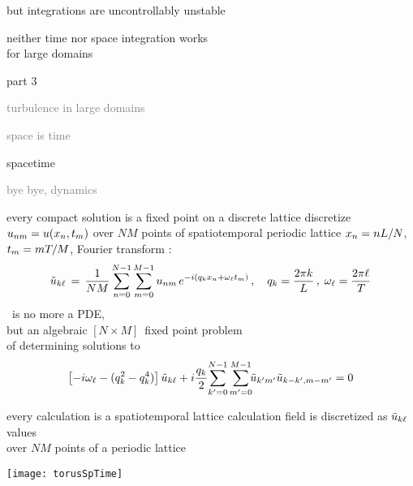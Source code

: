 \begin{frame}{but integrations are uncontrollably unstable}
\begin{center}
{\huge neither} time {\huge nor} space integration {\huge works} \\
for large domains
\end{center}

\vfill
\color{red}{rethink the calculation}
\end{frame}

\begin{frame}{part 3}
\begin{enumerate}
              \item
    \textcolor{gray}{\small
turbulence in large domains
              \item
space is time
    }
              \item {\Large
spacetime
    }\textcolor{gray}{\small
              \item
bye bye, dynamics
                    }
            \end{enumerate}
\end{frame}


\begin{frame}{every compact solution is a fixed point on a discrete lattice}
discretize $u_{nm} = u(x_n,t_m)$ over
$N M$ points of spatiotemporal periodic lattice $x_n = n L/N$,
 $t_m = m {T_{}}/M$, Fourier transform :
%
\[
\tilde{u}_{k\ell} \,=\,
  \frac{1}{NM} \sum^{N-1}_{n=0} \sum^{M-1}_{m=0}
  u_{nm} \, e^{-i(q_kx_n + \omega_\ell t_m)}
    \,,\quad
q_k = \frac{2 \pi k}{L}
    \,,\;
\omega_\ell = \frac{2 \pi \ell}{{T_{}}}
\]
\KS\ is no more a PDE, \\
but an algebraic $[N\!\times\!M]$\dmn\ fixed point problem \\
of determining solutions to
\[
\left[- i \omega_\ell - ( q_k^2 - q_k^4 ) \right]\tilde{u}_{k\ell}
+ i \frac{q_k}{2} \!\sum_{k'=0}^{N-1} \sum^{M-1}_{m'=0}\!\!
\tilde{u}_{k'm'} \tilde{u}_{k-k',m-m'}
    =
0
\]
\end{frame}

\begin{frame}{every calculation is a spatiotemporal lattice calculation}
field is discretized as
$\tilde{u}_{k\ell}$ values  \\ over
$N M$ points of a periodic lattice


\begin{center}
\texttt{[image: torusSpTime]}
\end{center}
\end{frame}



